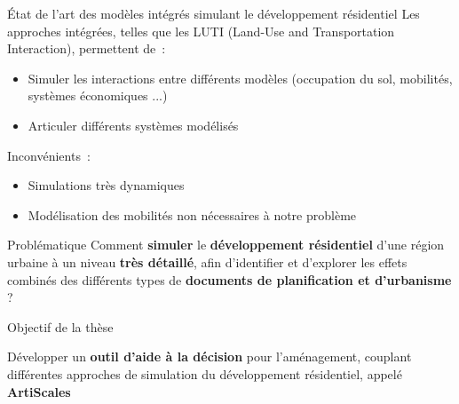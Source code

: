 \documentclass[xcolor=table]{beamer}
\begin{document}
\begin{frame}{État de l'art des modèles intégrés simulant le développement résidentiel}
Les approches intégrées, telles que les LUTI (Land-Use and Transportation Interaction), permettent de~:
\begin{itemize}
	\item Simuler les interactions entre différents modèles (occupation du sol, mobilités, systèmes économiques ...) 
	\item Articuler différents systèmes modélisés 
\end{itemize}
Inconvénients~:
\begin{itemize}
	\item Simulations très dynamiques
	\item Modélisation des mobilités non nécessaires à notre problème
\end{itemize}
\end{frame}

\begin{frame}{Problématique}
	Comment \textbf{simuler} le \textbf{développement résidentiel} d'une région urbaine à un niveau \textbf{très détaillé}, afin d'identifier et d'explorer les effets combinés des différents types de \textbf{documents de planification et d'urbanisme} ?
\end{frame}

\begin{frame}{Objectif de la thèse}
	\begin{block}{}
		Développer un \textbf{outil d'aide à la décision} pour l'aménagement, couplant différentes approches de simulation du développement résidentiel, appelé \textbf{ArtiScales}
	\end{block}
\end{frame}
\end{document}
